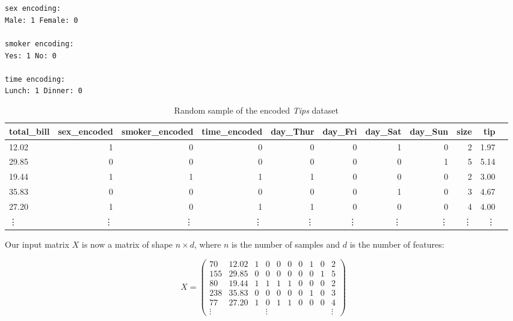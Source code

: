

\texttt{sex encoding:\\
Male: 1 Female: 0\\ \\
smoker encoding:\\
Yes: 1 No: 0 \\ \\
time encoding:\\ 
Lunch: 1 Dinner: 0
}

\begin{table}[ht]
    \centering 
    \begin{tabular}{lrrrrrrrrrr}
        \toprule
        total\_bill & sex\_encoded & smoker\_encoded & time\_encoded & day\_Thur & day\_Fri & day\_Sat & day\_Sun & size & tip \\
        \midrule
        12.02 & 1 & 0 & 0 & 0 & 0 & 1 & 0 & 2 & 1.97 \\
        29.85 & 0 & 0 & 0 & 0 & 0 & 0 & 1 & 5 & 5.14 \\
        19.44 & 1 & 1 & 1 & 1 & 0 & 0 & 0 & 2 & 3.00 \\
        35.83 & 0 & 0 & 0 & 0 & 0 & 1 & 0 & 3 & 4.67 \\
        27.20 & 1 & 0 & 1 & 1 & 0 & 0 & 0 & 4 & 4.00 \\
        \vdots & \vdots & \vdots & \vdots & \vdots & \vdots & \vdots & \vdots & \vdots & \vdots\\
        \bottomrule
    \end{tabular}      
    \caption{Random sample of the encoded \emph{Tips} dataset}
    \label{tab:encoded_data}
\end{table}

Our input matrix $X$ is now a matrix of shape $n\times d$, where $n$ is the number of samples and $d$ is the number of features:

$$
X = \left(\begin{array}{cccccccccc}
    70 & 12.02 & 1 & 0 & 0 & 0 & 0 & 1 & 0 & 2 \\ 
    155 & 29.85 & 0 & 0 & 0 & 0 & 0 & 0 & 1 & 5  \\
    80 & 19.44 & 1 & 1 & 1 & 1 & 0 & 0 & 0 & 2  \\
    238 & 35.83 & 0 & 0 & 0 & 0 & 0 & 1 & 0 & 3  \\
    77 & 27.20 & 1 & 0 & 1 & 1 & 0 & 0 & 0 & 4  \\
    \vdots & & & \vdots & & & & & & \vdots
\end{array}\right)
$$

